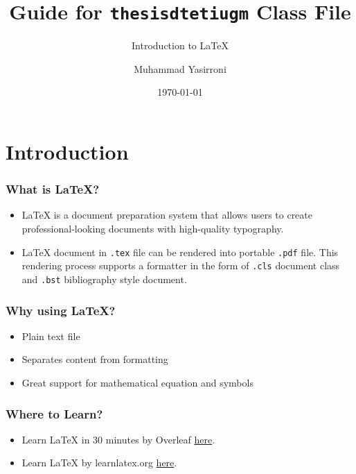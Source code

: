 \documentclass{beamer}
\title{Guide for \texttt{thesisdtetiugm} Class File}
\subtitle{Introduction to LaTeX}
\author{Muhammad Yasirroni}
\institute{Universitas Gadjah Mada}
\date{\today}
\begin{document}
\begin{frame}
  \titlepage
\end{frame}

\section{Introduction}
\begin{frame}
  \frametitle{What is LaTeX?}
  \begin{itemize}
    \item LaTeX is a document preparation system that allows users to create professional-looking documents with high-quality typography.
    \item LaTeX document in \texttt{.tex} file can be rendered into portable \texttt{.pdf} file. This rendering process supports a formatter in the form of \texttt{.cls} document class and \texttt{.bst} bibliography style document.
  \end{itemize}
\end{frame}

\begin{frame}
  \frametitle{Why using LaTeX?}
  \begin{itemize}
    \item Plain text file
    \item Separates content from formatting
    \item Great support for mathematical equation and symbols
  \end{itemize}
\end{frame}

\begin{frame}
  \frametitle{Where to Learn?}
  \begin{itemize}
    \item Learn LaTeX in 30 minutes by Overleaf \href{https://www.overleaf.com/learn/latex/Learn\_LaTeX\_in\_30\_minutes}{here}.
    \item Learn LaTeX by learnlatex.org \href{https://www.learnlatex.org/en/}{here}.
  \end{itemize}
\end{frame}
\end{document}
